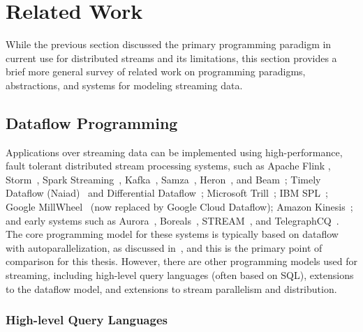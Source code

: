 \chapter{Related Work}
\label{cha:rw}

While the previous section discussed the primary programming paradigm in current use for distributed streams and its limitations, this section provides a brief more general survey of related work on programming paradigms, abstractions, and systems for modeling streaming data.

\section{Dataflow Programming}

Applications over streaming data can be implemented using
high-performance, fault tolerant distributed stream processing systems, such as
Apache
Flink \cite{Flink2015,Flink2017,Flink},
Storm~\cite{Storm},
Spark Streaming~\cite{Spark2013,SparkStreaming},
Kafka~\cite{garg2013apache},
Samza~\cite{Samza2017},
Heron~\cite{kulkarni2015twitter-heron,Heron},
and Beam~\cite{Beam};
Timely Dataflow (Naiad)~\cite{Naiad2013,Timely}
and
Differential Dataflow~\cite{mcsherry2013differential};
Microsoft
Trill~\cite{chandramouli2014trill};
IBM SPL~\cite{HAG2013SPL};
Google MillWheel~\cite{MillWheel} (now replaced by Google Cloud Dataflow);
Amazon Kinesis~\cite{AmazonKinesis};
and early systems such as
Aurora~\cite{Aurora,AuroraWeb},
Boreals~\cite{Borealis,BorealisWeb},
STREAM~\cite{STREAM2004},
and TelegraphCQ~\cite{Telegraph}.
The core programming model for these systems is typically based on dataflow with autoparallelization, as discussed in~,
and this is the primary point of comparison for this thesis.
However, there are other programming models used for streaming, including
high-level query languages (often based on SQL),
extensions to the dataflow model,
and extensions to stream parallelism and distribution.

\subsection{High-level Query Languages}

